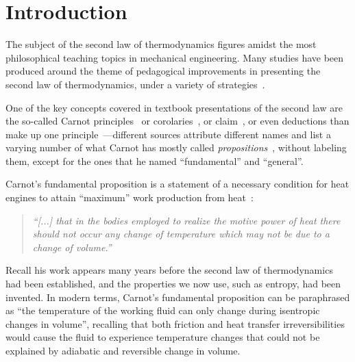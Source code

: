 \section{Introduction}

    The subject of the second law  of  thermodynamics  figures  amidst  the  most  philosophical
    teaching topics in mechanical engineering. Many studies have been produced around the  theme
    of pedagogical improvements in presenting the second law of thermodynamics, under a  variety
    of    strategies~\cite{1995-MoukalledF+NuwayhidRY-IJMEE,     1996-KaufmanR+SheldonE-AmJPhys,
    1997-BejanA-IJMEE,              1997-DunbarWR+LiorN-IJMEE,               2011-LewinsJ-IJMEE,
    2015-BeaubouefSr-IntJMechEngEduc}.

    One of the key concepts covered  in  textbook  presentations  of  the  second  law  are  the
    so-called          Carnot          principles~\cite{2013-CengelYA+BolesMA-AMGH}           or
    corolaries~\cite{2002-MoranMJ+ShapiroHN-LTC}, or  claim~\cite[p.~88]{2006-BejanA-Wiley},  or
    even deductions than make up  one  principle~\cite{1986-JonesJB+HawkinsGA-Wiley}---different
    sources attribute different names and list a varying number of what Carnot has mostly called
    \emph{propositions}~\cite{1897-ThurstonRH-Wiley}, without labeling them, except for the ones
    that he named ``fundamental'' and ``general''.

    Carnot's fundamental proposition is a statement of a necessary condition for heat engines to
    attain ``maximum'' work production from heat~\cite[p.~56]{1897-ThurstonRH-Wiley}:

    \begin{quote}
        \it
        ``[...] that in the bodies employed to realize the motive  power
        of heat there should not occur any change of  temperature  which
        may not be due to a change of volume.''
    \end{quote}

    Recall his work appears many  years  before  the  second  law  of  thermodynamics  had  been
    established, and the properties we now use, such as entropy, had been  invented.  In  modern
    terms, Carnot's fundamental proposition can be  paraphrased  as  ``the  temperature  of  the
    working fluid can only change during isentropic changes in  volume'',  recalling  that  both
    friction and heat transfer irreversibilities would cause the fluid to experience temperature
    changes that could not be explained by adiabatic and reversible change in volume.

